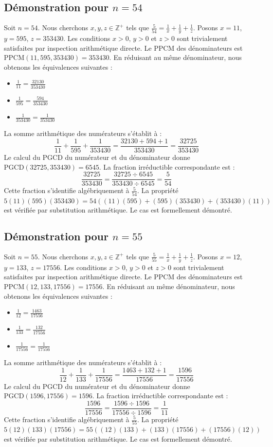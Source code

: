 \documentclass[12pt,a4paper]{article}
\begin{document}
\subsection{Démonstration pour $n = 54$}
Soit $n = 54$. Nous cherchons $x, y, z \in \mathbb{Z}^{+}$ tels que $\frac{5}{54} = \frac{1}{x} + \frac{1}{y} + \frac{1}{z}$.
Posons $x = 11$, $y = 595$, $z = 353430$.
Les conditions $x > 0$, $y > 0$ et $z > 0$ sont trivialement satisfaites par inspection arithmétique directe.
Le PPCM des dénominateurs est $\text{PPCM}(11, 595, 353430) = 353430$.
En réduisant au même dénominateur, nous obtenons les équivalences suivantes :
\begin{itemize}
    \item $\frac{1}{11} = \frac{32130}{353430}$
    \item $\frac{1}{595} = \frac{594}{353430}$
    \item $\frac{1}{353430} = \frac{1}{353430}$
\end{itemize}
La somme arithmétique des numérateurs s'établit à :
$$ \frac{1}{11} + \frac{1}{595} + \frac{1}{353430} = \frac{32130 + 594 + 1}{353430} = \frac{32725}{353430} $$
Le calcul du PGCD du numérateur et du dénominateur donne $\text{PGCD}(32725, 353430) = 6545$.
La fraction irréductible correspondante est :
$$ \frac{32725}{353430} = \frac{32725 \div 6545}{353430 \div 6545} = \frac{5}{54} $$
Cette fraction s'identifie algébriquement à $\frac{5}{54}$.
La propriété $5(11)(595)(353430) = 54((11)(595) + (595)(353430) + (353430)(11))$ est vérifiée par substitution arithmétique.
Le cas est formellement démontré.

\subsection{Démonstration pour $n = 55$}
Soit $n = 55$. Nous cherchons $x, y, z \in \mathbb{Z}^{+}$ tels que $\frac{5}{55} = \frac{1}{x} + \frac{1}{y} + \frac{1}{z}$.
Posons $x = 12$, $y = 133$, $z = 17556$.
Les conditions $x > 0$, $y > 0$ et $z > 0$ sont trivialement satisfaites par inspection arithmétique directe.
Le PPCM des dénominateurs est $\text{PPCM}(12, 133, 17556) = 17556$.
En réduisant au même dénominateur, nous obtenons les équivalences suivantes :
\begin{itemize}
    \item $\frac{1}{12} = \frac{1463}{17556}$
    \item $\frac{1}{133} = \frac{132}{17556}$
    \item $\frac{1}{17556} = \frac{1}{17556}$
\end{itemize}
La somme arithmétique des numérateurs s'établit à :
$$ \frac{1}{12} + \frac{1}{133} + \frac{1}{17556} = \frac{1463 + 132 + 1}{17556} = \frac{1596}{17556} $$
Le calcul du PGCD du numérateur et du dénominateur donne $\text{PGCD}(1596, 17556) = 1596$.
La fraction irréductible correspondante est :
$$ \frac{1596}{17556} = \frac{1596 \div 1596}{17556 \div 1596} = \frac{1}{11} $$
Cette fraction s'identifie algébriquement à $\frac{5}{55}$.
La propriété $5(12)(133)(17556) = 55((12)(133) + (133)(17556) + (17556)(12))$ est vérifiée par substitution arithmétique.
Le cas est formellement démontré.
\end{document}
